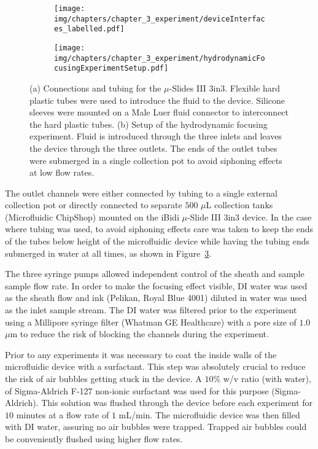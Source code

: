 \begin{figure}[htb]
	\centering
	\begin{subfigure}[b]{0.48\textwidth}
		\texttt{[image: img/chapters/chapter\_3\_experiment/deviceInterfaces\_labelled.pdf]}
         \caption{}
		\label{fig:interfaceTubingConnection}  
    \end{subfigure}
    \hfill
	\begin{subfigure}[b]{0.48\textwidth}
		\texttt{[image: img/chapters/chapter\_3\_experiment/hydrodynamicFocusingExperimentSetup.pdf]}
         \caption{}    
		\label{fig:hydrodynamicFocusingExperimentSetup}            
	\end{subfigure}
	\caption[Tubing connections to iBidi $\mu$-Slides III 3in3 interface for the hydrodynamic focusing experiment]{(a) Connections and tubing for the $\mu$-Slides III 3in3. Flexible hard plastic tubes were used to introduce the fluid to the device.  Silicone sleeves were mounted on a Male Luer fluid connector to interconnect the hard plastic tubes. (b) Setup of the hydrodynamic focusing experiment. Fluid is introduced through the three inlets and leaves the device through the three outlets. The ends of the outlet tubes were submerged in a single collection pot to avoid siphoning effects at low flow rates.}
\end{figure}

The outlet channels were either connected by tubing to a single external collection pot or directly connected to separate $500$ $\mu$L collection tanks (Microfluidic ChipShop) mounted on the iBidi $\mu$-Slide III 3in3 device. In the case where tubing was used, to avoid siphoning effects care was taken to keep the ends of the tubes below height of the microfluidic device while having the tubing ends submerged in water at all times, as shown in Figure~\ref{fig:hydrodynamicFocusingExperimentSetup}.

The three syringe pumps allowed independent control of the sheath and sample sample flow rate. In order to make the focusing effect visible, DI water was used as the sheath flow and ink (Pelikan, Royal Blue 4001) diluted in water was used as the inlet sample stream. The DI water was filtered prior to the experiment using a Millipore syringe filter (Whatman GE Healthcare) with a pore size of $1.0$ $\mu$m to reduce the risk of blocking the channels during the experiment.

Prior to any experiments it was necessary to coat the inside walls of the microfluidic device with a surfactant. This step was absolutely crucial to reduce the risk of air bubbles getting stuck in the device. A $10\%$ w/v ratio (with water), of Sigma-Aldrich F-127 non-ionic surfactant was used for this purpose (Sigma-Aldrich). This solution was flushed through the device before each experiment for $10$ minutes at a flow rate of $1$ mL/min. The microfluidic device was then filled with DI water, assuring no air bubbles were trapped. Trapped air bubbles could be conveniently flushed using higher flow rates. 

